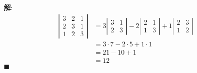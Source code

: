 \documentclass{report}
\newcommand{\sol}{\vspace{0.2cm}\textbf{解}:}
\begin{document}
\begin{enumerate}
        \sol{}
        \begin{align*}
          \left|\begin{array}{lll}3 & 2 & 1 \\ 2 & 3 & 1 \\ 1 & 2 & 3\end{array}\right| & = 3 \left|\begin{array}{ll}3 & 1 \\ 2 & 3\end{array}\right| - 2 \left|\begin{array}{ll}2 & 1 \\ 1 & 3\end{array}\right| + 1 \left|\begin{array}{ll}2 & 3 \\ 1 & 2\end{array}\right| \\
                                                                                        & = 3 \cdot 7 - 2 \cdot 5 + 1 \cdot 1                                                                                                                                                 \\
                                                                                        & = 21 - 10 + 1                                                                                                                                                                       \\
                                                                                        & = 12
        \end{align*} \hfill$\blacksquare$
\end{enumerate}
\end{document}
